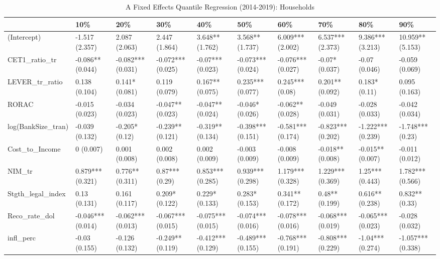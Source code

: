 \begin{table}[ht]
\centering
\caption{A Fixed Effects Quantile Regression (2014-2019): Households} 
\begingroup\small
\begin{tabular}{llllllllll}
  \toprule
 & 10\% & 20\% & 30\% & 40\% & 50\% & 60\% & 70\% & 80\% & 90\% \\ 
  \midrule
(Intercept) & -1.517 (2.357) & 2.087 (2.063) & 2.447 (1.864) & 3.648** (1.762) & 3.568** (1.737) & 6.009*** (2.002) & 6.537*** (2.373) & 9.386*** (3.213) & 10.959** (5.153) \\ 
  CET1\_ratio\_tr & -0.086** (0.044) & -0.082*** (0.031) & -0.072*** (0.025) & -0.07*** (0.023) & -0.073*** (0.024) & -0.076*** (0.027) & -0.07* (0.037) & -0.07 (0.046) & -0.059 (0.069) \\ 
  LEVER\_tr\_ratio & 0.138 (0.104) & 0.141* (0.081) & 0.119 (0.079) & 0.167** (0.075) & 0.235*** (0.077) & 0.245*** (0.08) & 0.201** (0.092) & 0.183* (0.11) & 0.095 (0.163) \\ 
  RORAC & -0.015 (0.023) & -0.034 (0.023) & -0.047** (0.023) & -0.047** (0.024) & -0.046* (0.026) & -0.062** (0.028) & -0.049 (0.031) & -0.028 (0.033) & -0.042 (0.034) \\ 
  log(BankSize\_tran) & -0.039 (0.132) & -0.205* (0.12) & -0.239** (0.121) & -0.319** (0.134) & -0.398*** (0.151) & -0.581*** (0.174) & -0.823*** (0.202) & -1.222*** (0.239) & -1.748*** (0.23) \\ 
  Cost\_to\_Income & 0 (0.007) & 0.001 (0.008) & 0.002 (0.008) & 0.002 (0.009) & -0.003 (0.009) & -0.008 (0.009) & -0.018** (0.008) & -0.015** (0.007) & -0.011 (0.012) \\ 
  NIM\_tr & 0.879*** (0.321) & 0.776** (0.311) & 0.87*** (0.29) & 0.853*** (0.285) & 0.939*** (0.298) & 1.179*** (0.328) & 1.229*** (0.369) & 1.25*** (0.443) & 1.782*** (0.566) \\ 
  Stgth\_legal\_index & 0.13 (0.131) & 0.161 (0.117) & 0.209* (0.122) & 0.229* (0.133) & 0.283* (0.153) & 0.341** (0.172) & 0.48** (0.199) & 0.616** (0.238) & 0.832** (0.33) \\ 
  Reco\_rate\_dol & -0.046*** (0.014) & -0.062*** (0.013) & -0.067*** (0.015) & -0.075*** (0.015) & -0.074*** (0.016) & -0.078*** (0.016) & -0.068*** (0.019) & -0.065*** (0.023) & -0.028 (0.032) \\ 
  infl\_perc & -0.03 (0.155) & -0.126 (0.132) & -0.249** (0.119) & -0.412*** (0.129) & -0.489*** (0.155) & -0.768*** (0.191) & -0.808*** (0.229) & -1.04*** (0.274) & -1.057*** (0.338) \\ 

\end{tabular}
\end{table}
